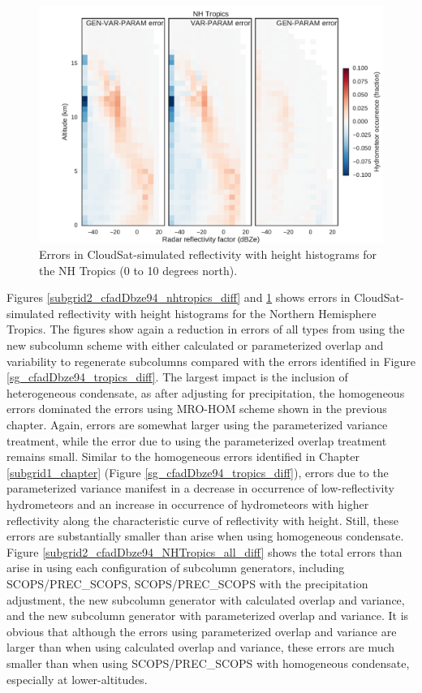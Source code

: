 \begin{figure}
\centering
\includegraphics[width=\columnwidth]{graphics/subgrid2_cfadDbze94_NHTropics_gen-var-param_diff.pdf}
\caption{Errors in CloudSat-simulated reflectivity with height histograms for the NH Tropics (0 to 10 degrees north).}
\label{subgrid2_cfadDbze94_nhtropics_gen-var-param_diff}
\end{figure}

Figures \ref{subgrid2_cfadDbze94_nhtropics_diff} and \ref{subgrid2_cfadDbze94_nhtropics_gen-var-param_diff} shows errors in CloudSat-simulated reflectivity with height histograms for the Northern Hemisphere Tropics. The figures show again a reduction in errors of all types from using the new subcolumn scheme with either calculated or parameterized overlap and variability to regenerate subcolumns compared with the errors identified in Figure \ref{sg_cfadDbze94_tropics_diff}. The largest impact is the inclusion of heterogeneous condensate, as after adjusting for precipitation, the homogeneous errors dominated the errors using MRO-HOM scheme shown in the previous chapter. Again, errors are somewhat larger using the parameterized variance treatment, while the error due to using the parameterized overlap treatment remains small. Similar to the homogeneous errors identified in Chapter \ref{subgrid1_chapter} (Figure \ref{sg_cfadDbze94_tropics_diff}), errors due to the parameterized variance manifest in a decrease in occurrence of low-reflectivity hydrometeors and an increase in occurrence of hydrometeors with higher reflectivity along the characteristic curve of reflectivity with height. Still, these errors are substantially smaller than arise when using homogeneous condensate. Figure \ref{subgrid2_cfadDbze94_NHTropics_all_diff} shows the total errors than arise in using each configuration of subcolumn generators, including SCOPS/PREC\_SCOPS, SCOPS/PREC\_SCOPS with the precipitation adjustment, the new subcolumn generator with calculated overlap and variance, and the new subcolumn generator with parameterized overlap and variance. It is obvious that although the errors using parameterized overlap and variance are larger than when using calculated overlap and variance, these errors are much smaller than when using SCOPS/PREC\_SCOPS with homogeneous condensate, especially at lower-altitudes.

